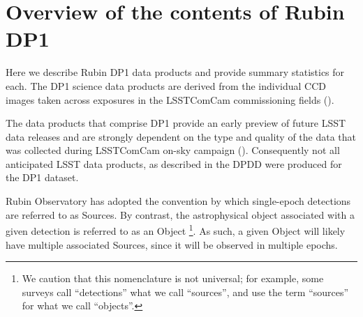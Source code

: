 
\section{Overview of the contents of Rubin DP1
\label{sec:data_products}}

Here we describe Rubin \gls{DP1} data products and provide summary statistics for each.
The \gls{DP1} science data products are derived from the \nvisitimages individual \gls{CCD} images taken across \nexposures exposures in the \nfields \gls{LSSTComCam} commissioning fields ().

The data products that comprise \gls{DP1} provide an early preview of future LSST data releases and are strongly dependent on the type and quality of the data that was collected during \gls{LSSTComCam} on-sky campaign ().
Consequently not all anticipated  \gls{LSST} data products, as described in the \gls{DPDD} \citep{LSE-163} were produced for the \gls{DP1} dataset.

Rubin Observatory has adopted the convention by which single-epoch detections are referred to as Sources.
By contrast, the astrophysical object associated with a given detection is referred to as an Object
\footnote{We caution that this nomenclature is not universal; for example, some surveys call ``detections'' what we call ``sources'', and use the term ``sources'' for what we call ``objects''.}.
As such, a given Object will likely have multiple associated  Sources, since it will be observed in multiple epochs.

